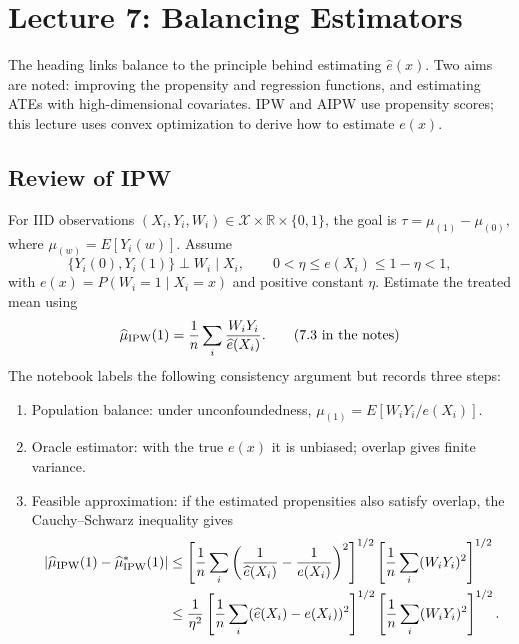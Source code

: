 \section{Lecture 7: Balancing Estimators}
The heading links balance to the principle behind estimating $\widehat e(x)$.
 Two aims are noted: improving the propensity and regression functions, and estimating ATEs with high-dimensional covariates. IPW and AIPW use propensity scores; this lecture uses convex optimization to derive how to estimate $e(x)$.
\subsection{Review of IPW}
For IID observations $(X_i,Y_i,W_i)\in\mathcal X\times\mathbb R\times\{0,1\}$, the goal is $\tau=\mu_{(1)}-\mu_{(0)}$, where $\mu_{(w)}=E[Y_i(w)]$. Assume
\[
\{Y_i(0),Y_i(1)\}\perp W_i\mid X_i,\qquad
0<\eta\leq e(X_i)\leq1-\eta<1,
\]
with $e(x)=P(W_i=1\mid X_i=x)$ and positive constant $\eta$. Estimate the treated mean using
\[
\widehat\mu_{\rm IPW}(1)=\frac1n\sum_i\frac{W_iY_i}{\widehat e(X_i)}.
\tag{7.3 in the notes}
\]
The notebook labels the following consistency argument  but records three steps:
\begin{enumerate}
\item Population balance: under unconfoundedness, $\mu_{(1)}=E[W_iY_i/e(X_i)]$.
\item Oracle estimator: with the true $e(x)$ it is unbiased; overlap gives finite variance.
\item Feasible approximation: if the estimated propensities also satisfy overlap, the Cauchy--Schwarz inequality gives
\begin{align*}
|\widehat\mu_{\rm IPW}(1)-\widehat\mu^*_{\rm IPW}(1)|
&\leq\left[\frac1n\sum_i\left(\frac1{\widehat e(X_i)}-\frac1{e(X_i)}\right)^2\right]^{1/2}
\left[\frac1n\sum_i(W_iY_i)^2\right]^{1/2}\\
&\leq\frac1{\eta^2}\left[\frac1n\sum_i(\widehat e(X_i)-e(X_i))^2\right]^{1/2}
\left[\frac1n\sum_i(W_iY_i)^2\right]^{1/2}.
\end{align*}
\end{enumerate}
